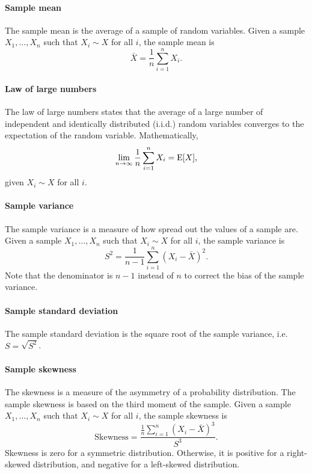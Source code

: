 \paragraph{Sample mean}  The sample mean is the average of a sample of random variables.
Given a sample $X_1, \dots, X_n$ such that $X_i \sim X$ for all $i$, the sample mean is
\begin{equation*}
  \bar{X} = \frac{1}{n} \sum_{i = 1}^n X_i\text{.}
\end{equation*}

\paragraph{Law of large numbers}  The law of large numbers states that the average of
a large number of independent and identically distributed (i.i.d.) random variables converges
to the expectation of the random variable.  Mathematically,
\begin{equation*}
  \lim_{n \rightarrow \infty} \frac{1}{n} \sum_{i = 1}^n X_i = \operatorname{E}[X]\text{,}
\end{equation*}
given $X_i \sim X$ for all $i$.

\paragraph{Sample variance}  The sample variance is a measure of how spread out the
values of a sample are.  Given a sample $X_1, \dots, X_n$ such that $X_i \sim X$ for all
$i$, the sample variance is
\begin{equation*}
  S^2 = \frac{1}{n - 1} \sum_{i = 1}^n (X_i - \bar{X})^2\text{.}
\end{equation*}
Note that the denominator is $n - 1$ instead of $n$ to correct the bias of the sample
variance.

\paragraph{Sample standard deviation}  The sample standard deviation is the square root
of the sample variance, i.e. $S = \sqrt{S^2}$.

\paragraph{Sample skewness}  The skewness is a measure of the asymmetry of a probability
distribution.  The sample skewness is based on the third moment of the sample.  Given a
sample $X_1, \dots, X_n$ such that $X_i \sim X$ for all $i$, the sample skewness is
\begin{equation*}
  \text{Skewness} = \frac{\frac{1}{n} \sum_{i = 1}^n (X_i - \bar{X})^3}{S^3}\text{.}
\end{equation*}
Skewness is zero for a symmetric distribution.  Otherwise, it is positive for a right-skewed distribution,
and negative for a left-skewed distribution.


